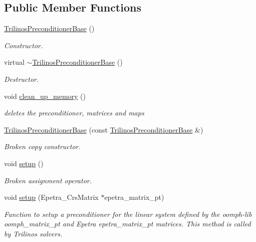 \subsection*{Public Member Functions}
\begin{DoxyCompactItemize}
\item 
\hyperlink{classoomph_1_1TrilinosPreconditionerBase_aebe14e80ad9c0323ea4faf568743b204}{Trilinos\+Preconditioner\+Base} ()
\begin{DoxyCompactList}\small\item\em Constructor. \end{DoxyCompactList}\item 
virtual \hyperlink{classoomph_1_1TrilinosPreconditionerBase_a5d82e0cefa29fee69f80fb376763e584}{$\sim$\+Trilinos\+Preconditioner\+Base} ()
\begin{DoxyCompactList}\small\item\em Destructor. \end{DoxyCompactList}\item 
void \hyperlink{classoomph_1_1TrilinosPreconditionerBase_a6cc1da6ffb61bec844ccd33f6e5e8807}{clean\+\_\+up\+\_\+memory} ()
\begin{DoxyCompactList}\small\item\em deletes the preconditioner, matrices and maps \end{DoxyCompactList}\item 
\hyperlink{classoomph_1_1TrilinosPreconditionerBase_ae6354e67e90407bf538b7d7750719e67}{Trilinos\+Preconditioner\+Base} (const \hyperlink{classoomph_1_1TrilinosPreconditionerBase}{Trilinos\+Preconditioner\+Base} \&)
\begin{DoxyCompactList}\small\item\em Broken copy constructor. \end{DoxyCompactList}\item 
void \hyperlink{classoomph_1_1TrilinosPreconditionerBase_aaef80c74c1d94a42420e3362194efce9}{setup} ()
\begin{DoxyCompactList}\small\item\em Broken assignment operator. \end{DoxyCompactList}\item 
void \hyperlink{classoomph_1_1TrilinosPreconditionerBase_a5548dff11ca795d13386ca64956a2c73}{setup} (Epetra\+\_\+\+Crs\+Matrix $\ast$epetra\+\_\+matrix\+\_\+pt)
\begin{DoxyCompactList}\small\item\em Function to setup a preconditioner for the linear system defined by the oomph-\/lib oomph\+\_\+matrix\+\_\+pt and Epetra epetra\+\_\+matrix\+\_\+pt matrices. This method is called by Trilinos solvers. \end{DoxyCompactList}\item 

\end{DoxyCompactItemize}
